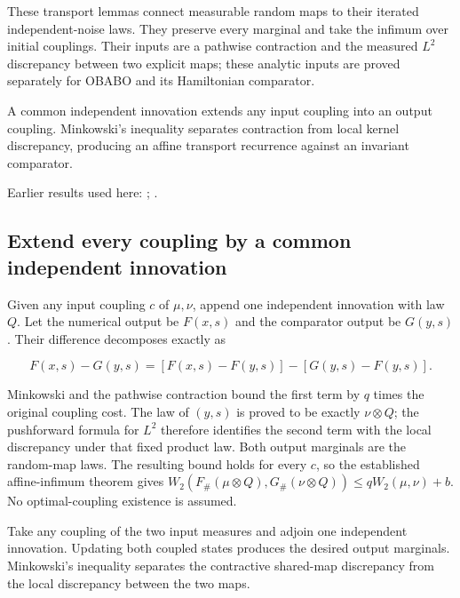 \documentclass[11pt,a4paper]{report}
\begin{document}
These transport lemmas connect measurable random maps to their iterated independent-noise laws. They preserve every marginal and take the infimum over initial couplings. Their inputs are a pathwise contraction and the measured \(L^{2}\) discrepancy between two explicit maps; these analytic inputs are proved separately for OBABO and its Hamiltonian comparator.



A common independent innovation extends any input coupling into an output coupling. Minkowski’s inequality separates contraction from local kernel discrepancy, producing an affine transport recurrence against an invariant comparator.



Earlier results used here: \cite[Section~3.15]{LangevinLean2026ULASC}; \cite[Section~3.33]{LangevinLean2026ULASC}.
\subsection{\texorpdfstring{Extend every coupling by a common independent innovation}{Extend every coupling by a common independent innovation}}
\label{report-step-KineticLangevin-RandomMapPerturbation-lean-1}


Given any input coupling \(c\) of \(\mu,\nu\), append one independent innovation with law \(Q\). Let the numerical output be \(F(x,s)\) and the comparator output be \(G(y,s)\). Their difference decomposes exactly as

\[F(x,s)-G(y,s)=[F(x,s)-F(y,s)]-[G(y,s)-F(y,s)].\]

Minkowski and the pathwise contraction bound the first term by \(q\) times the original coupling cost. The law of \((y,s)\) is proved to be exactly \(\nu\otimes Q\); the pushforward formula for \(L^{2}\) therefore identifies the second term with the local discrepancy under that fixed product law. Both output marginals are the random-map laws. The resulting bound holds for every \(c\), so the established affine-infimum theorem gives \(W_2(F_\#(\mu\otimes Q),G_\#(\nu\otimes Q))\le qW_2(\mu,\nu)+b\). No optimal-coupling existence is assumed.



Take any coupling of the two input measures and adjoin one independent innovation. Updating both coupled states produces the desired output marginals. Minkowski’s inequality separates the contractive shared-map discrepancy from the local discrepancy between the two maps.
\end{document}
